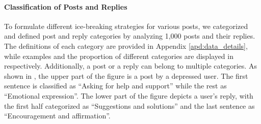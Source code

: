 \paragraph{Classification of Posts and Replies}
\label{sec:category}
To formulate different ice-breaking strategies for various posts, we categorized and defined post and reply categories by analyzing 1,000 posts and their replies.
The definitions of each category are provided in Appendix \ref{apd:data_details}, while examples and the proportion of different categories are displayed in  respectively. Additionally, a post or a reply can belong to multiple categories. As shown in , the upper part of the figure is a post by a depressed user. The first sentence is classified as  ``Asking for help and support'' while the rest as ``Emotional expression''. The lower part of the figure depicts a user's reply, with the first half categorized as ``Suggestions and solutions'' and the last sentence as ``Encouragement and affirmation''.
